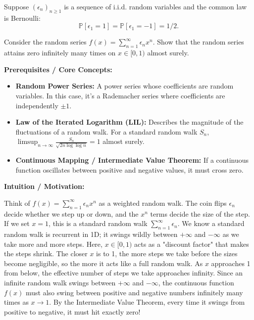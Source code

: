 \begin{exercise}\label{probability:2019:3}
Suppose $(\epsilon_n)_{n \geq 1}$ is a sequence of i.i.d. random variables and the common law is Bernoulli:
\[
\mathbb{P}[\epsilon_1 = 1] = \mathbb{P}[\epsilon_1 = -1] = 1/2.
\]

Consider the random series $f(x) = \sum_{n=1}^\infty \epsilon_n x^n$. Show that the random series attains zero infinitely many times on $x \in [0,1)$ almost surely.
\end{exercise}

\begin{solution}
\textbf{Prerequisites / Core Concepts:}
\begin{itemize}
    \item \textbf{Random Power Series:} A power series whose coefficients are random variables. In this case, it's a Rademacher series where coefficients are independently $\pm 1$.
    \item \textbf{Law of the Iterated Logarithm (LIL):} Describes the magnitude of the fluctuations of a random walk. For a standard random walk $S_n$, $\limsup_{n \to \infty} \frac{S_n}{\sqrt{2n \log \log n}} = 1$ almost surely.
    \item \textbf{Continuous Mapping / Intermediate Value Theorem:} If a continuous function oscillates between positive and negative values, it must cross zero.
\end{itemize}

\textbf{Intuition / Motivation:}

Think of $f(x) = \sum_{n=1}^\infty \epsilon_n x^n$ as a weighted random walk. The coin flips $\epsilon_n$ decide whether we step up or down, and the $x^n$ terms decide the size of the step.
If we set $x=1$, this is a standard random walk $\sum_{n=1}^\infty \epsilon_n$. We know a standard random walk is recurrent in 1D; it swings wildly between $+\infty$ and $-\infty$ as we take more and more steps.
Here, $x \in [0, 1)$ acts as a "discount factor" that makes the steps shrink. The closer $x$ is to 1, the more steps we take before the sizes become negligible, so the more it acts like a full random walk.
As $x$ approaches 1 from below, the effective number of steps we take approaches infinity. Since an infinite random walk swings between $+\infty$ and $-\infty$, the continuous function $f(x)$ must also swing between positive and negative numbers infinitely many times as $x \to 1$. By the Intermediate Value Theorem, every time it swings from positive to negative, it must hit exactly zero!


\end{solution}
